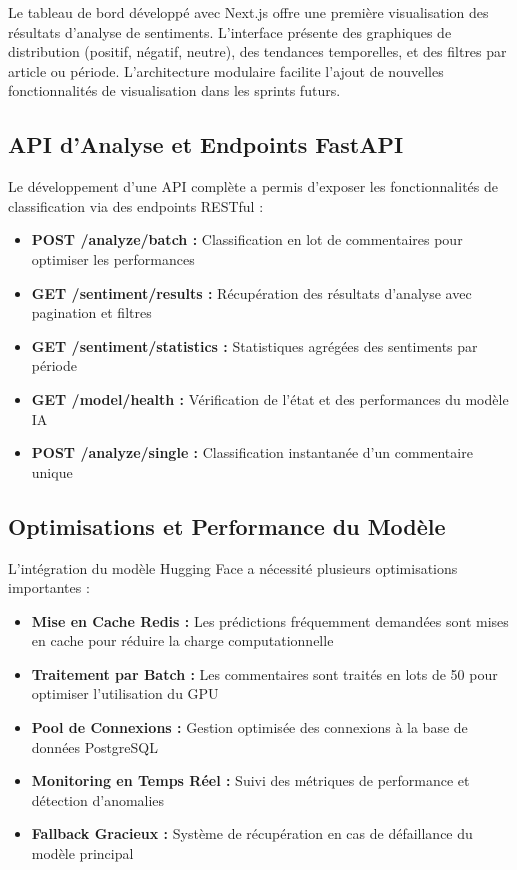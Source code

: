 Le tableau de bord développé avec Next.js offre une première visualisation des résultats d'analyse de sentiments. L'interface présente des graphiques de distribution (positif, négatif, neutre), des tendances temporelles, et des filtres par article ou période. L'architecture modulaire facilite l'ajout de nouvelles fonctionnalités de visualisation dans les sprints futurs.

\subsection{API d'Analyse et Endpoints FastAPI}

Le développement d'une API complète a permis d'exposer les fonctionnalités de classification via des endpoints RESTful :

\begin{itemize}
    \item \textbf{POST /analyze/batch :} Classification en lot de commentaires pour optimiser les performances
    \item \textbf{GET /sentiment/results :} Récupération des résultats d'analyse avec pagination et filtres
    \item \textbf{GET /sentiment/statistics :} Statistiques agrégées des sentiments par période
    \item \textbf{GET /model/health :} Vérification de l'état et des performances du modèle IA
    \item \textbf{POST /analyze/single :} Classification instantanée d'un commentaire unique
\end{itemize}

\subsection{Optimisations et Performance du Modèle}

L'intégration du modèle Hugging Face a nécessité plusieurs optimisations importantes :

\begin{itemize}
    \item \textbf{Mise en Cache Redis :} Les prédictions fréquemment demandées sont mises en cache pour réduire la charge computationnelle
    \item \textbf{Traitement par Batch :} Les commentaires sont traités en lots de 50 pour optimiser l'utilisation du GPU
    \item \textbf{Pool de Connexions :} Gestion optimisée des connexions à la base de données PostgreSQL
    \item \textbf{Monitoring en Temps Réel :} Suivi des métriques de performance et détection d'anomalies
    \item \textbf{Fallback Gracieux :} Système de récupération en cas de défaillance du modèle principal
\end{itemize}

